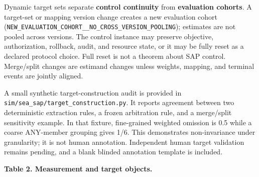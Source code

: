 \documentclass[
  11pt]{article}
\begin{document}
Dynamic target sets separate \textbf{control continuity} from
\textbf{evaluation cohorts}. A target-set or mapping version change
creates a new evaluation cohort
(\texttt{NEW\_EVALUATION\_COHORT\_\_NO\_CROSS\_VERSION\_POOLING});
estimates are not pooled across versions. The control instance may
preserve objective, authorization, rollback, audit, and resource state,
or it may be fully reset as a declared protocol choice. Full reset is
not a theorem about SAP control. Merge/split changes are estimand
changes unless weights, mapping, and terminal events are jointly
aligned.

A small synthetic target-construction audit is provided in
\texttt{sim/sea\_sap/target\_construction.py}. It reports agreement
between two deterministic extraction rules, a frozen arbitration rule,
and a merge/split sensitivity example. In that fixture, fine-grained
weighted omission is 0.5 while a coarse ANY-member grouping gives 1/6.
This demonstrates non-invariance under granularity; it is not human
annotation. Independent human target validation remains pending, and a
blank blinded annotation template is included.

\textbf{Table 2. Measurement and target objects.}
\end{document}
